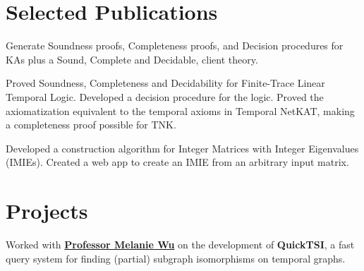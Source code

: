 \documentclass[]{deedy-resume-openfont}
\begin{document}
\begin{minipage}[t]{0.66\textwidth}
\section{Selected Publications}

Generate Soundness proofs, Completeness proofs, and Decision procedures for KAs plus a Sound, Complete and Decidable, client theory.
\sectionsep

Proved Soundness, Completeness and Decidability for Finite-Trace Linear Temporal Logic. Developed a decision procedure for the logic. Proved the axiomatization equivalent to the temporal axioms in Temporal NetKAT, making a completeness proof possible for TNK.
\sectionsep

Developed a construction algorithm for Integer Matrices with Integer Eigenvalues (IMIEs). Created a web app to create an IMIE from an arbitrary input matrix.
\sectionsep




\section{Projects}

Worked with \textbf{\href{http://www.cs.pomona.edu/~mwu/files/bio.htm}{Professor Melanie Wu}} on the development of \textbf{QuickTSI}, a fast query system for finding (partial) subgraph isomorphisms on temporal graphs.
\sectionsep

\sectionsep




\end{minipage}
\end{document}
